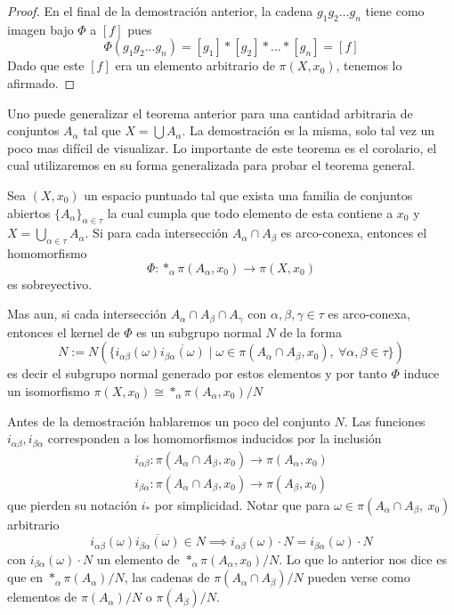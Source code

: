 \begin{proof}
  En el final de la demostración anterior, la cadena \(g_1 g_2 \dots
  g_n\) tiene como imagen bajo \(\Phi\) a \([f]\) pues
  \[ \Phi \left( g_1 g_2 ... g_n \right) = [g_1] * [g_2] * ... *
    [g_n] = [f] \]
  Dado que este \([f]\) era un elemento arbitrario de \(\pi \left( X,
    x_0 \right)\), tenemos lo afirmado.
\end{proof}
Uno puede generalizar el teorema anterior para una cantidad arbitraria
de conjuntos \(A_\alpha\) tal que \(X = \bigcup A_\alpha\). La
demostración es la misma, solo tal vez un poco mas difícil de
visualizar. Lo importante de este teorema es el corolario, el cual
utilizaremos en su forma generalizada para probar el teorema general.

\begin{teorema}[\vank]
  Sea \((X, x_0)\) un espacio puntuado tal que exista una familia de
  conjuntos abiertos \(\{A_\alpha\}_{\alpha \in \tau}\) la cual cumpla
  que todo elemento de esta contiene a \(x_0\) y \( X = \bigcup_{\alpha
  \in \tau} A_\alpha\). Si para cada intersección \(A_\alpha \cap
  A_\beta\) es arco-conexa, entonces el homomorfismo
  \[ \Phi : *_\alpha \pi (A_\alpha, x_0) \to \pi (X, x_0) \]
  es sobreyectivo.

  Mas aun, si cada intersección \(A_\alpha \cap A_\beta
  \cap A_\gamma\) con \( \alpha, \beta, \gamma \in \tau\) es arco-conexa,
  entonces el kernel de \(\Phi\) es un subgrupo normal \(N\) de la forma
  \[
    N := N \left( \{ i_{\alpha \beta} (\omega) \overline{i_{\beta
    \alpha} (\omega)} \mid \omega \in \pi \left( A_\alpha \cap A_\beta, x_0
    \right),\ \forall \alpha ,\beta \in \tau \} \right)
  \]
  es decir el subgrupo normal generado por estos elementos y por tanto
  \(\Phi\) induce un isomorfismo \(\pi (X, x_0) \cong *_\alpha \pi
  (A_\alpha, x_0) / N \)
\end{teorema}
Antes de la demostración hablaremos un poco del conjunto \(N\). Las
funciones \(i_{\alpha \beta}, i_{\beta \alpha}\) corresponden a los
homomorfismos inducidos por la inclusión
\begin{gather*}
  i_{\alpha \beta} : \pi (A_\alpha \cap A_\beta , x_0 ) \longrightarrow \pi (A_\alpha, x_0) \\
  i_{\beta \alpha} : \pi (A_\alpha \cap A_\beta , x_0 ) \longrightarrow \pi (A_\beta, x_0)
\end{gather*}
que pierden su notación \(i_*\) por simplicidad. Notar que
para \(\omega \in \pi (A_\alpha \cap A_\beta ,\ x_0)\) arbitrario
\[ i_{\alpha \beta} (\omega) \overline{i_{\beta \alpha} (\omega)} \in N
  \implies i_{\alpha \beta} (\omega) \cdot N = i_{\beta
\alpha} (\omega) \cdot N \]
con \(i_{\beta \alpha} (\omega) \cdot N\) un elemento de \(*_\alpha \pi
(A_\alpha , x_0) / N\). Lo que lo anterior nos dice es que en \(*_\alpha
\pi (A_\alpha) / N\), las cadenas de \(\pi (A_\alpha \cap A_\beta) / N\)
pueden verse como elementos de \(\pi(A_\alpha) / N\) o \(\pi (A_\beta) /
N\).

